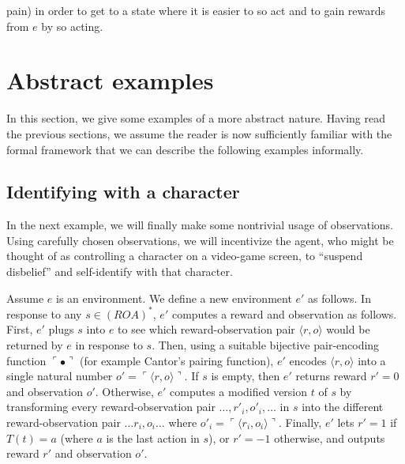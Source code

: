 \documentclass[runningheads]{llncs}
\begin{document}
\begin{example}
\begin{itemize}
        pain) in order to get to a state where it is easier to so act and
        to gain rewards from $e$ by so acting.
    \end{itemize}
\end{example}


\section{Abstract examples}

In this section, we give some examples of a more abstract nature.
Having read the previous sections, we assume the reader is now
sufficiently familiar with the formal framework that we can describe
the following examples informally.

\subsection{Identifying with a character}

In the next example,
we will finally make some nontrivial usage of observations. Using carefully chosen
observations, we will incentivize the agent, who might be thought of as
controlling a character on a video-game screen,
to ``suspend disbelief'' and self-identify with that character.

\begin{example}
\label{selfinsertionexample}
Assume $e$ is an environment. We define a new environment $e'$ as follows.
In response to any $s\in (ROA)^*$, $e'$ computes a reward and observation as
follows. First, $e'$ plugs $s$ into $e$ to see which reward-observation pair
$\langle r,o\rangle$ would be returned by $e$ in response to $s$.
Then, using a suitable bijective
pair-encoding function $\ulcorner\bullet\urcorner$
(for example Cantor's pairing function), $e'$
encodes $\langle r,o\rangle$ into a single natural number
$o'=\ulcorner\langle r,o\rangle\urcorner$. If $s$ is empty, then $e'$
returns reward $r'=0$ and observation $o'$. Otherwise,
$e'$ computes a modified version $t$ of $s$ by transforming every
reward-observation pair $\ldots,r'_i,o'_i,\ldots$ in $s$ into
the different reward-observation pair $\ldots r_i,o_i\ldots$
where $o'_i=\ulcorner \langle r_i,o_i\rangle\urcorner$.
Finally, $e'$ lets $r'=1$ if $T(t)=a$ (where $a$ is the last action
in $s$), or $r'=-1$ otherwise, and outputs reward $r'$ and observation $o'$.
\end{example}
\end{document}
